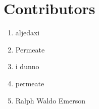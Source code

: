 \section{Contributors}
\begin{enumerate}
	\item aljedaxi
	\item Permeate
	\item i dunno
	\item permeate
	\item Ralph Waldo Emerson
\end{enumerate}